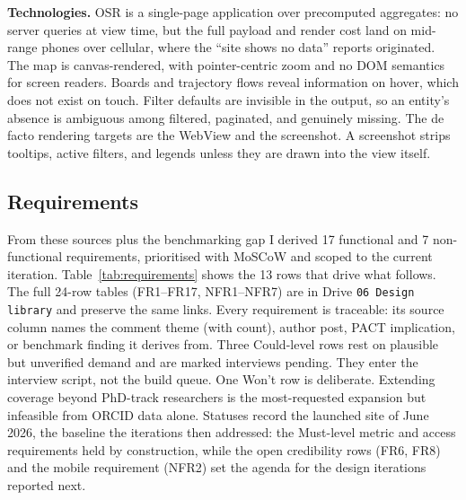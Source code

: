 \textbf{Technologies.} OSR is a single-page application over precomputed aggregates: no server queries at view time, but the full payload and render cost land on mid-range phones over cellular, where the ``site shows no data'' reports originated. The map is canvas-rendered, with pointer-centric zoom and no DOM semantics for screen readers. Boards and trajectory flows reveal information on hover, which does not exist on touch. Filter defaults are invisible in the output, so an entity's absence is ambiguous among filtered, paginated, and genuinely missing. The de facto rendering targets are the WebView and the screenshot. A screenshot strips tooltips, active filters, and legends unless they are drawn into the view itself.

\subsection{Requirements}

From these sources plus the benchmarking gap I derived 17 functional and 7 non-functional requirements, prioritised with MoSCoW and scoped to the current iteration. Table~\ref{tab:requirements} shows the 13 rows that drive what follows. The full 24-row tables (FR1--FR17, NFR1--NFR7) are in Drive \texttt{06 Design library} and preserve the same links. Every requirement is traceable: its source column names the comment theme (with count), author post, PACT implication, or benchmark finding it derives from. Three Could-level rows rest on plausible but unverified demand and are marked interviews pending. They enter the interview script, not the build queue. One Won't row is deliberate. Extending coverage beyond PhD-track researchers is the most-requested expansion but infeasible from ORCID data alone. Statuses record the launched site of June 2026, the baseline the iterations then addressed: the Must-level metric and access requirements held by construction, while the open credibility rows (FR6, FR8) and the mobile requirement (NFR2) set the agenda for the design iterations reported next.

